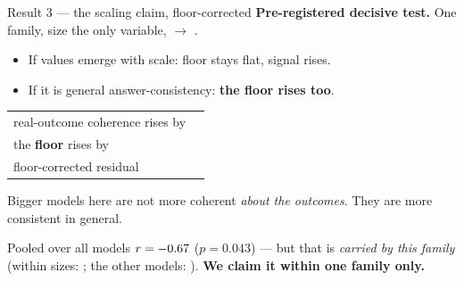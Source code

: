 \documentclass[aspectratio=169,11pt]{beamer}
\newcommand{\hl}[1]{\textcolor{accent}{\textbf{#1}}}
\begin{document}
\begin{frame}{Result 3 --- the scaling claim, floor-corrected}
  \textbf{Pre-registered decisive test.} One family, size the only variable,
  \LadderSmall{} $\rightarrow$ \LadderLarge{}.

  \bigskip
  \begin{itemize}
    \item If values emerge with scale: floor stays flat, signal rises.
    \item If it is general answer-consistency: \hl{the floor rises too}.
  \end{itemize}

  \bigskip
  \begin{center}
  \begin{tabular}{@{}lr@{}}
    \toprule
    real-outcome coherence rises by  & \LadderRRise{} \\
    the \hl{floor} rises by           & \hl{\LadderNRise{}} \\
    \midrule
    floor-corrected residual         & \hl{\LadderResidFall{}} \\
    \bottomrule
  \end{tabular}
  \end{center}

  \bigskip
  Bigger models here are not more coherent \emph{about the outcomes}.
  They are more consistent in general.

  \medskip
  \footnotesize
  Pooled over all \NModels{} models $r=-0.67$ ($p=0.043$) --- but that
  is \emph{carried by this family} (within \LadderNSizes{} sizes:
  \WithinFamilyCorr; the other \NOutsideFamily{} models: \OutsideFamilyCorr).
  \hl{We claim it within one family only.}
\end{frame}
\end{document}
